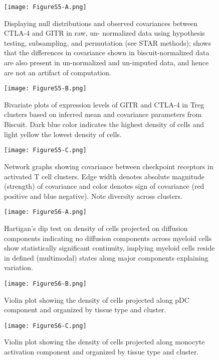 \begin{figure}
\centering
\texttt{[image: FigureS5-A.png]}
\caption{Displaying null distributions and observed covariances between CTLA-4 and GITR in raw, un- normalized data using hypothesis testing, subsampling, and permutation (see STAR methods); shows that the differences in covariance shown in biscuit-normalized data are also present in un-normalized and un-imputed data, and hence are not an artifact of computation.}
\label{fig:s5a}
\end{figure}

\begin{figure}
\centering
\texttt{[image: FigureS5-B.png]}
\caption{Bivariate plots of expression levels of GITR and CTLA-4 in Treg clusters based on inferred mean and covariance parameters from Biscuit. Dark blue color indicates the highest density of cells and light yellow the lowest density of cells.
}

\label{fig:s5b}
\end{figure}

\begin{figure}
\centering
\texttt{[image: FigureS5-C.png]}
\caption{Network graphs showing covariance between checkpoint receptors in activated T cell clusters. Edge width denotes absolute magnitude (strength) of covariance and color denotes sign of covariance (red positive and blue negative). Note diversity across clusters. 
}

\label{fig:s5c}
\end{figure}

\begin{figure}
\centering
\texttt{[image: FigureS6-A.png]}
\caption{Hartigan’s dip test on density of cells projected on diffusion components indicating no diffusion components across myeloid cells show statistically significant continuity, implying myeloid cells reside in defined (multimodal) states along major components explaining variation.}
\label{fig:s6a}
\end{figure}

\begin{figure}
\centering
\texttt{[image: FigureS6-B.png]}
\caption{Violin plot showing the density of cells projected along pDC component and organized by tissue type and cluster.
}
\label{fig:s6b}
\end{figure}


\begin{figure}
\centering
\texttt{[image: FigureS6-C.png]}
\caption{Violin plot showing the density of cells projected along monocyte activation component and organized by tissue type and cluster.
}
\label{fig:s6c}
\end{figure}


